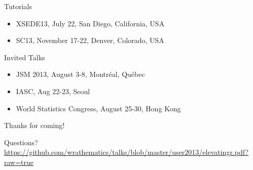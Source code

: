 \begin{frame}
  \begin{block}{Tutorials}
  \begin{itemize}
    \item {\small XSEDE13, July 22, San Diego, California, USA }
    \item {\small SC13, November 17-22, Denver, Colorado, USA }
  \end{itemize}
  \end{block}
  \begin{block}{Invited Talks}
  \begin{itemize}
    \item {\small JSM 2013, August 3-8, Montr\'eal, Qu\'ebec }
    \item {\small IASC, Aug 22-23, Seoul}
    \item {\small World Statistics Congress, August 25-30, Hong Kong }
  \end{itemize}
  \end{block}
\end{frame}
  
\hidenum
\begin{frame}[noframenumbering]
 \begin{block}{Thanks for coming!}
 \begin{center}
     {\Large Questions?}\\[.6cm]
     \url{https://github.com/wrathematics/talks/blob/master/user2013/elevatingr.pdf?raw=true}
  \end{center}
 \end{block}
\end{frame}
